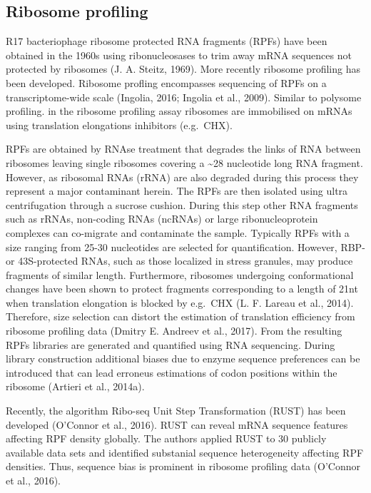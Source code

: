 \documentclass[12pt,openany]{book}
\begin{document}
\subsection{Ribosome profiling} \label{riboseq}

R17 bacteriophage ribosome protected RNA fragments (RPFs) have been
obtained in the 1960s using ribonucleosases to trim away mRNA sequences
not protected by ribosomes (J. A. Steitz, 1969). More recently ribosome
profiling has been developed. Ribosome profling encompasses sequencing
of RPFs on a transcriptome-wide scale (Ingolia, 2016; Ingolia et al.,
2009). Similar to polysome profiling. in the ribosome profiling assay
ribosomes are immobilised on mRNAs using translation elongations
inhibitors (e.g.~CHX).

RPFs are obtained by RNAse treatment that degrades the links of RNA
between ribosomes leaving single ribosomes covering a
\textasciitilde{}28 nucleotide long RNA fragment. However, as ribosomal
RNAs (rRNA) are also degraded during this process they represent a major
contaminant herein. The RPFs are then isolated using ultra
centrifugation through a sucrose cushion. During this step other RNA
fragments such as rRNAs, non-coding RNAs (ncRNAs) or large
ribonucleoprotein complexes can co-migrate and contaminate the sample.
Typically RPFs with a size ranging from 25-30 nucleotides are selected
for quantification. However, RBP-or 43S-protected RNAs, such as those
localized in stress granules, may produce fragments of similar length.
Furthermore, ribosomes undergoing conformational changes have been shown
to protect fragments corresponding to a length of 21nt when translation
elongation is blocked by e.g.~CHX (L. F. Lareau et al., 2014).
Therefore, size selection can distort the estimation of translation
efficiency from ribosome profiling data (Dmitry E. Andreev et al.,
2017). From the resulting RPFs libraries are generated and quantified
using RNA sequencing. During library construction additional biases due
to enzyme sequence preferences can be introduced that can lead erroneus
estimations of codon positions within the ribosome (Artieri et al.,
2014a).

Recently, the algorithm Ribo-seq Unit Step Transformation (RUST) has
been developed (O'Connor et al., 2016). RUST can reveal mRNA sequence
features affecting RPF density globally. The authors applied RUST to 30
publicly available data sets and identified substanial sequence
heterogeneity affecting RPF densities. Thus, sequence bias is prominent
in ribosome profiling data (O'Connor et al., 2016).
\end{document}
